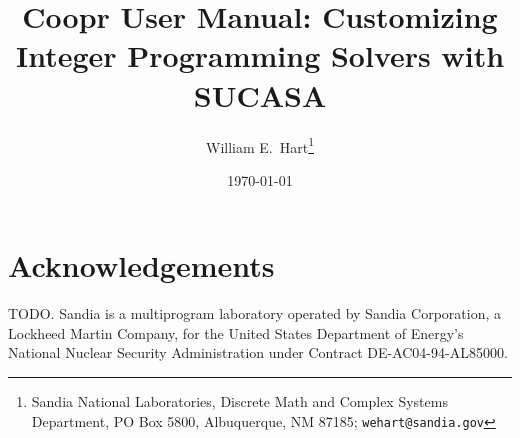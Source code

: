\documentclass[12pt]{book}
\begin{document}
\title{Coopr User Manual: Customizing Integer Programming Solvers with SUCASA}

\author{William E.\ Hart\footnote{Sandia National Laboratories, Discrete Math and Complex Systems Department, PO Box 5800, Albuquerque, NM 87185; {\tt wehart@sandia.gov}} 
}

\date{\today}

\maketitle

\lstset{language=Python}
\lstset{aboveskip=1em,belowskip=1em}

\tableofcontents







\section*{Acknowledgements} 

TODO.
Sandia is a multiprogram laboratory
operated by Sandia Corporation, a Lockheed Martin Company, for the United
States Department of Energy's National Nuclear Security Administration
under Contract DE-AC04-94-AL85000.




\end{document}

